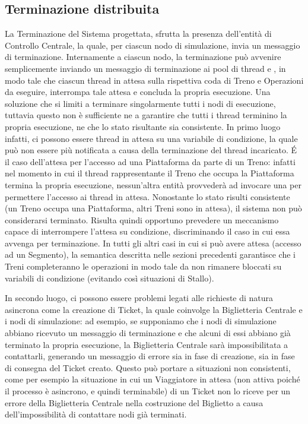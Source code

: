 \newpage
\subsection{Terminazione distribuita}\label{sec:distributed_termination}

La Terminazione del Sistema progettata, sfrutta la presenza dell'entità di Controllo Centrale, la quale, per ciascun nodo di simulazione, invia un messaggio di terminazione. Internamente a ciascun nodo, la terminazione può avvenire semplicemente inviando un messaggio di terminazione ai pool di thread  e , in modo tale che ciascun thread in attesa sulla rispettiva coda di Treno e Operazioni da eseguire, interrompa tale attesa e concluda la propria esecuzione. Una soluzione che si limiti a terminare singolarmente tutti i nodi di esecuzione, tuttavia questo non è sufficiente ne a garantire che tutti i thread terminino la propria esecuzione, ne che lo stato risultante sia consistente. In primo luogo infatti, ci possono essere thread in attesa su una variabile di condizione, la quale può non essere più notificata a causa della terminazione del thread incaricato. \'E il caso dell'attesa per l'accesso ad una Piattaforma da parte di un Treno: infatti nel momento in cui il thread rappresentante il Treno che occupa la Piattaforma termina la propria esecuzione, nessun'altra entità provvederà ad invocare una  per permettere l'accesso ai thread in attesa. Nonostante lo stato risulti consistente (un Treno occupa una Piattaforma, altri Treni sono in attesa), il sistema non può considerarsi terminato. Risulta quindi opportuno prevedere un meccanismo capace di interrompere l'attesa su condizione, discriminando il caso in cui essa avvenga per terminazione. In tutti gli altri casi in cui si può avere attesa (accesso ad un Segmento), la semantica descritta nelle sezioni precedenti garantisce che i Treni completeranno le operazioni in modo tale da non rimanere bloccati su variabili di condizione (evitando così situazioni di Stallo).

	In secondo luogo, ci possono essere problemi legati alle richieste di natura asincrona come la creazione di Ticket, la quale coinvolge la Biglietteria Centrale e i nodi di simulazione: ad esempio, se supponiamo che i nodi di simulazione abbiano ricevuto un messaggio di terminazione e che alcuni di essi abbiano già terminato la propria esecuzione, la Biglietteria Centrale sarà impossibilitata a contattarli, generando un messaggio di errore sia in fase di creazione, sia in fase di consegna del Ticket creato. Questo può portare a situazioni non consistenti, come per esempio la situazione in cui un Viaggiatore in attesa (non attiva poiché il processo è asincrono, e quindi terminabile) di un Ticket non lo riceve per un errore della Biglietteria Centrale nella costruzione del Biglietto a causa dell'impossibilità di contattare nodi già terminati.
	
